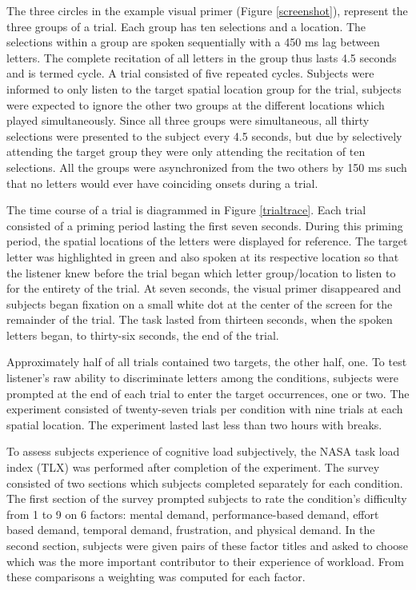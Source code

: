 \documentclass[10pt]{article}
\begin{document}
The three circles in the example visual primer (Figure
\ref{screenshot}), represent the three groups of a trial.
Each group has ten selections and a location.  The selections
within a group are spoken sequentially with a 450 ms lag
between letters.  The complete recitation of all letters in
the group thus lasts 4.5 seconds and is termed cycle.  A trial
consisted of five repeated cycles. Subjects were informed to
only listen to the target spatial location group for the
trial, subjects were expected to ignore the other two groups
at the different locations which played simultaneously. Since
all three groups were simultaneous, all thirty selections were
presented to the subject every 4.5 seconds, but due by
selectively attending the target group they were only
attending the recitation of ten selections. All the groups
were asynchronized from the two others by 150 ms such that no
letters would ever have coinciding onsets during a trial.

The time course of a trial is diagrammed in Figure \ref{trialtrace}.
Each trial consisted of a priming period lasting the first seven
seconds.  During this priming period, the spatial locations of the
letters were displayed for reference.  The target letter was
highlighted in green and also spoken at its respective location so
that the listener knew before the trial began which letter
group/location to listen to for the entirety of the trial. At seven
seconds, the visual primer disappeared and subjects began fixation on
a small white dot at the center of the screen for the remainder of
the trial.  The task lasted from thirteen seconds, when the spoken
letters began, to thirty-six seconds, the end of the trial.

Approximately half of all trials contained two targets, the
other half, one. To test listener's raw ability to
discriminate letters among the conditions, subjects were
prompted at the end of each trial to enter the target
occurrences, one or two.  The experiment consisted of
twenty-seven trials per condition with nine trials at each
spatial location.  The experiment lasted last less than two
hours with breaks.  


To assess subjects experience of cognitive load subjectively, the
NASA task load index (TLX) was performed after completion of the
experiment.  The survey consisted of two sections which subjects
completed separately for each condition.  The first section of
the survey prompted subjects to rate the condition's difficulty from
1 to 9 on 6 factors: mental demand, performance-based demand, effort
based demand, temporal demand, frustration, and physical demand. In
the second section, subjects were given pairs of these factor titles and
asked to choose which was the more important contributor to
their experience of workload.  From these comparisons a weighting was computed for each
factor.  
\end{document}
